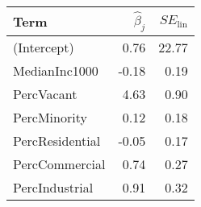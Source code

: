 \begin{table}[ht]
\centering
\begin{tabular}{lrr}
  \hline
Term & $\widehat{\beta}_{j}$ & $SE_{\text{lin}}$ \\ 
  \hline
(Intercept) & 0.76 & 22.77 \\ 
  MedianInc1000 & -0.18 & 0.19 \\ 
  PercVacant & 4.63 & 0.90 \\ 
  PercMinority & 0.12 & 0.18 \\ 
  PercResidential & -0.05 & 0.17 \\ 
  PercCommercial & 0.74 & 0.27 \\ 
  PercIndustrial & 0.91 & 0.32 \\ 
   \hline
\end{tabular}
\end{table}
